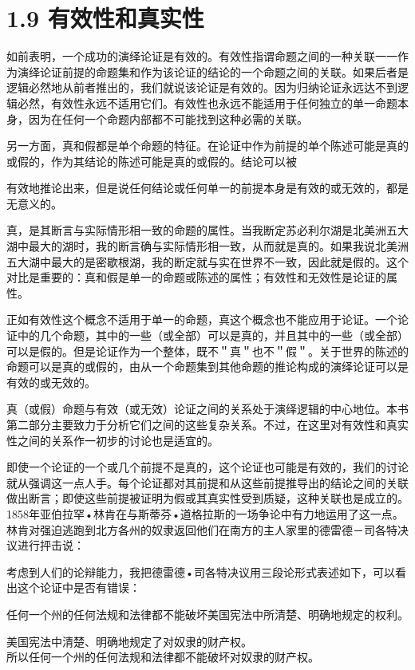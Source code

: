 \section*{1.9 有效性和真实性}
如前表明，一个成功的演绎论证是有效的。有效性指谓命题之间的一种关联一一作为演绎论证前提的命题集和作为该论证的结论的一个命题之间的关联。如果后者是逻辑必然地从前者推出的，我们就说该论证是有效的。因为归纳论证永远达不到逻辑必然，有效性永远不适用它们。有效性也永远不能适用于任何独立的单一命题本身，因为在任何一个命题内部都不可能找到这种必需的关联。

另一方面，真和假都是单个命题的特征。在论证中作为前提的单个陈述可能是真的或假的，作为其结论的陈述可能是真的或假的。结论可以被

有效地推论出来，但是说任何结论或任何单一的前提本身是有效的或无效的，都是无意义的。

真，是其断言与实际情形相一致的命题的属性。当我断定苏必利尔湖是北美洲五大湖中最大的湖时，我的断言确与实际情形相一致，从而就是真的。如果我说北美洲五大湖中最大的是密歇根湖，我的断定就与实在世界不一致，因此就是假的。这个对比是重要的：真和假是单一的命题或陈述的属性；有效性和无效性是论证的属性。

正如有效性这个概念不适用于单一的命题，真这个概念也不能应用于论证。一个论证中的几个命题，其中的一些（或全部）可以是真的，并且其中的一些（或全部）可以是假的。但是论证作为一个整体，既不＂真＂也不＂假＂。关于世界的陈述的命题可以是真的或假的，由从一个命题集到其他命题的推论构成的演绎论证可以是有效的或无效的。

真（或假）命题与有效（或无效）论证之间的关系处于演绎逻辑的中心地位。本书第二部分主要致力于分析它们之间的这些复杂关系。不过，在这里对有效性和真实性之间的关系作一初步的讨论也是适宜的。

即使一个论证的一个或几个前提不是真的，这个论证也可能是有效的，我们的讨论就从强调这一点人手。每个论证都对其前提和从这些前提推导出的结论之间的关联做出断言；即使这些前提被证明为假或其真实性受到质疑，这种关联也是成立的。1858年亚伯拉罕•林肯在与斯蒂芬•道格拉斯的一场争论中有力地运用了这一点。林肯对强迫逃跑到北方各州的奴隶返回他们在南方的主人家里的德雷德－司各特决议进行抨击说：

考虑到人们的论辩能力，我把德雷德•司各特决议用三段论形式表述如下，可以看出这个论证中是否有错误：

任何一个州的任何法规和法律都不能破坏美国宪法中所清楚、明确地规定的权利。

美国宪法中清楚、明确地规定了对奴隶的财产权。\\
所以任何一个州的任何法规和法律都不能破坏对奴隶的财产权。

